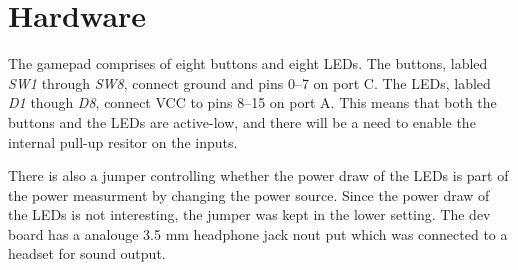 \section{Hardware}
The gamepad comprises of eight buttons and eight LEDs.
The buttons, labled \emph{SW1} through \emph{SW8}, connect ground and pins 0--7 on port C.
The LEDs, labled \emph{D1} though \emph{D8}, connect VCC to pins 8--15 on port A.
This means that both the buttons and the LEDs are active-low, and there will be a need to enable the internal pull-up resitor on the inputs.

There is also a jumper controlling whether the power draw of the LEDs is part of the power measurment by changing the power source.
Since the power draw of the LEDs is not interesting, the jumper was kept in the lower setting.
The dev board has a analouge 3.5 mm headphone jack nout put which was connected to a headset for sound output.
